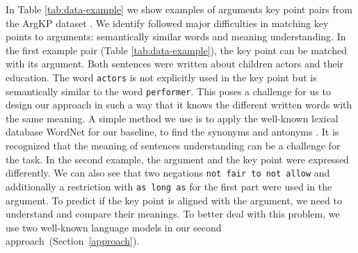 In Table \ref{tab:data-example} we show examples of arguments key point pairs from the ArgKP dataset \cite{Bar-HaimEFKLS2020}. 
We identify followed major difficulties in matching key points to arguments: semantically similar words and meaning understanding.
In the first example pair (Table \ref{tab:data-example}), the key point can be matched with its argument. Both sentences were written about children actors and their education. The word \texttt{actors} is not explicitly used in the key point but is semantically similar to the word \texttt{performer}. 
This poses a challenge for us to design our approach in such a way that it knows the different written words with the same meaning. 
A simple method we use is to apply the well-known lexical database WordNet for our baseline, to find the synonyms and antonyms \cite{Miller1995}.
It is recognized that the meaning of sentences understanding can be a challenge for the task. In the second example, the argument and the key point were expressed differently. We can also see that two negations \texttt{not fair to not allow} and additionally a restriction with \texttt{as long as} for the first part were used in the argument. 
To predict if the key point is aligned with the argument, we need to understand and compare their meanings. 
To better deal with this problem, we use two well-known language models in our second approach~(Section~\ref{approach}).

